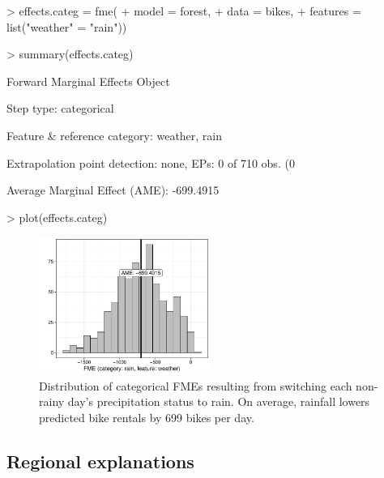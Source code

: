 \begin{example}
> effects.categ = fme(
+   model = forest,
+   data = bikes,
+   features = list("weather" = "rain"))

> summary(effects.categ)

Forward Marginal Effects Object

Step type:
  categorical

Feature & reference category:
  weather, rain

Extrapolation point detection:
  none, EPs: 0 of 710 obs. (0 %

Average Marginal Effect (AME):
  -699.4915

> plot(effects.categ)
\end{example}
\begin{figure}[H]
    \centering
    \includegraphics[width = 0.5\textwidth]{figures/pcateg.pdf}
    \caption{Distribution of categorical FMEs resulting from switching each non-rainy day's precipitation status to rain. On average, rainfall lowers predicted bike rentals by 699 bikes per day.}
    \label{fig:categ_fme}
\end{figure}


\subsection{Regional explanations}
\label{sec:regional_explanations}

